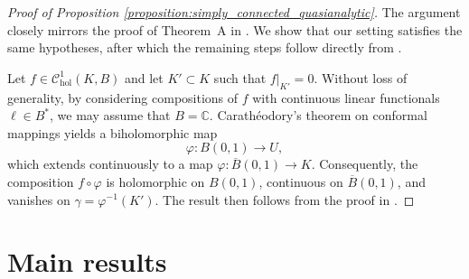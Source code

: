 \documentclass[10pt]{article}
\begin{document}
\begin{proof}[Proof of Proposition \ref{proposition:simply_connected_quasianalytic}]
The argument closely mirrors the proof of Theorem~A in \cite{MarmiSauzin_2011}. We show that our setting satisfies the same hypotheses, after which the remaining steps follow directly from \cite{MarmiSauzin_2011}. 

Let $f \in \mathscr{C}^1_{\text{hol}}(K, B)$ and let $K' \subset K$ such that $f|_{K'} = 0$. Without loss of generality, by considering compositions of $f$ with continuous linear functionals $\ell \in B^*$, we may assume that $B = \mathbb{C}$. Carathéodory's theorem on conformal mappings yields a biholomorphic map
\[
\varphi \colon B(0,1) \to U,
\]
which extends continuously to a map $\varphi \colon \overline{B}(0,1) \to K$. Consequently, the composition $f \circ \varphi$ is holomorphic on $B(0,1)$, continuous on $\overline{B}(0,1)$, and vanishes on $\gamma = \varphi^{-1}(K')$. The result then follows from the proof in \cite{MarmiSauzin_2011}.

\end{proof}

\section{Main results}
\end{document}
